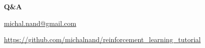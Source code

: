 \documentclass[xcolor=dvipsnames]{beamer}
\begin{document}
\begin{frame}{\bf Q\&A}


\url{michal.nand@gmail.com}

\url{https://github.com/michalnand/reinforcement_learning_tutorial}

 
\end{frame}
\end{document}
